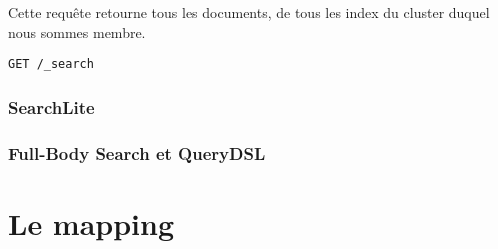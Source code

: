 Cette requête retourne tous les documents, de tous les index du cluster duquel nous
sommes membre.

\begin{lstlisting}[style=code,label={lst:APIsearchemptyexample2},caption={Réponse type à notre requête précédente}]
GET /_search
\end{lstlisting}




\subsubsection{SearchLite}

\subsubsection{Full-Body Search et QueryDSL}

\section{Le mapping}
